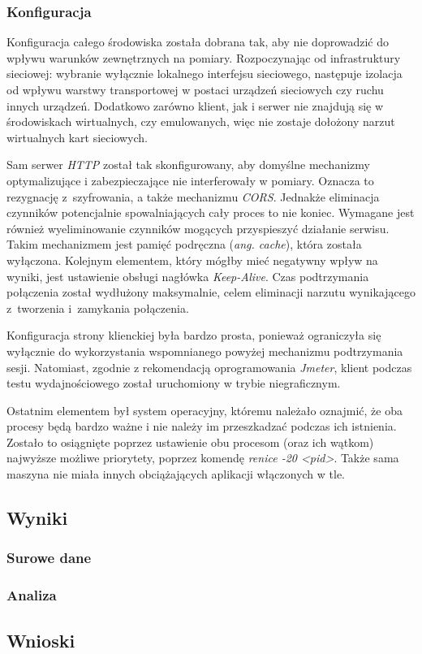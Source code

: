 \documentclass[12pt]{article}
\newcommand{\n}{\newline}
\newcommand{\nonpl}[1]{{\it #1}}
\newcommand{\code}[1]{{\it #1}}
\newcommand{\ang}[1]{\nonpl{ang. #1}}
\newcommand{\HTTP}{\nonpl{HTTP} }
\newcommand{\Jmeter}{\nonpl{Jmeter}\texttrademark}
\begin{document}
{{			{
				\subsubsection{Konfiguracja}

				Konfiguracja całego środowiska została dobrana tak, aby nie doprowadzić do wpływu warunków zewnętrznych na pomiary. Rozpoczynając od infrastruktury sieciowej:
				wybranie wyłącznie lokalnego interfejsu sieciowego, następuje izolacja od wpływu warstwy transportowej w postaci urządzeń sieciowych czy ruchu innych urządzeń.
				Dodatkowo zarówno klient, jak i serwer nie znajdują się w środowiskach wirtualnych, czy emulowanych, więc nie zostaje dołożony narzut wirtualnych kart sieciowych.\n

				Sam serwer \HTTP został tak skonfigurowany, aby domyślne mechanizmy optymalizujące i zabezpieczające nie interferowały w pomiary. Oznacza to rezygnację z~szyfrowania,
				a także mechanizmu \nonpl{CORS}. Jednakże eliminacja czynników potencjalnie spowalniających cały proces to nie koniec. Wymagane jest również wyeliminowanie
				czynników mogących przyspieszyć działanie serwisu. Takim mechanizmem jest pamięć podręczna (\ang{cache}), która została wyłączona. Kolejnym elementem, który mógłby mieć negatywny
				wpływ na wyniki, jest ustawienie obsługi nagłówka \code{Keep-Alive}. Czas podtrzymania połączenia został wydłużony maksymalnie, celem eliminacji narzutu wynikającego
				z~tworzenia i~zamykania połączenia.\n

				Konfiguracja strony klienckiej była bardzo prosta, ponieważ ograniczyła się wyłącznie do wykorzystania wspomnianego powyżej mechanizmu podtrzymania sesji. Natomiast,
				zgodnie z rekomendacją oprogramowania \Jmeter, klient podczas testu wydajnościowego został uruchomiony w trybie niegraficznym.\n

				Ostatnim elementem był system operacyjny, któremu należało oznajmić, że oba procesy będą bardzo ważne i nie należy im przeszkadzać podczas ich istnienia. Zostało to
				osiągnięte poprzez ustawienie obu procesom (oraz ich wątkom) najwyższe możliwe priorytety, poprzez komendę \code{renice -20 <pid>}.
				Także sama maszyna nie miała innych obciążających aplikacji włączonych w tle.
			}
		}

		{
			\subsection{Wyniki}

			{
				\subsubsection{Surowe dane}
			}

			{
				\subsubsection{Analiza}
			}
		}

		{
			\subsection{Wnioski}
		}
	}
\end{document}
